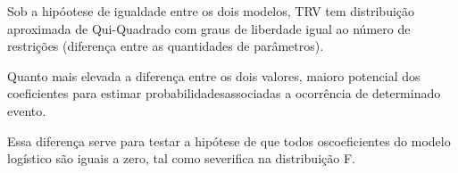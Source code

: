 \documentclass[
]{article}
\begin{document}
Sob a hipóotese de igualdade entre os dois modelos, TRV tem distribuição
aproximada de Qui-Quadrado com graus de liberdade igual ao número de
restrições (diferença entre as quantidades de parâmetros).

Quanto mais elevada a diferença entre os dois valores, maioro potencial
dos coeficientes para estimar probabilidadesassociadas a ocorrência de
determinado evento.

Essa diferença serve para testar a hipótese de que todos oscoeficientes
do modelo logístico são iguais a zero, tal como severifica na
distribuição F.
\end{document}
